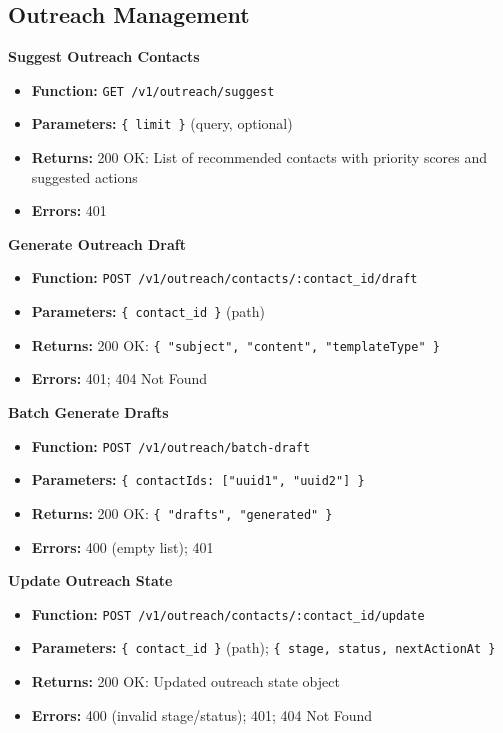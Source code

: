 \documentclass[a4paper]{article}
\begin{document}
\subsection{Outreach Management}

\textbf{Suggest Outreach Contacts}
\begin{itemize}
  \item \textbf{Function:} \texttt{GET /v1/outreach/suggest}
  \item \textbf{Parameters:} \texttt{\{ limit \}} (query, optional)
  \item \textbf{Returns:} 200 OK: List of recommended contacts with priority scores and suggested actions
  \item \textbf{Errors:} 401
\end{itemize}

\textbf{Generate Outreach Draft}
\begin{itemize}
  \item \textbf{Function:} \texttt{POST /v1/outreach/contacts/:contact\_id/draft}
  \item \textbf{Parameters:} \texttt{\{ contact\_id \}} (path)
  \item \textbf{Returns:} 200 OK: \texttt{\{ "subject", "content", "templateType" \}}
  \item \textbf{Errors:} 401; 404 Not Found
\end{itemize}

\textbf{Batch Generate Drafts}
\begin{itemize}
  \item \textbf{Function:} \texttt{POST /v1/outreach/batch-draft}
  \item \textbf{Parameters:} \texttt{\{ contactIds: ["uuid1", "uuid2"] \}}
  \item \textbf{Returns:} 200 OK: \texttt{\{ "drafts", "generated" \}}
  \item \textbf{Errors:} 400 (empty list); 401
\end{itemize}

\textbf{Update Outreach State}
\begin{itemize}
  \item \textbf{Function:} \texttt{POST /v1/outreach/contacts/:contact\_id/update}
  \item \textbf{Parameters:} \texttt{\{ contact\_id \}} (path); \texttt{\{ stage, status, nextActionAt \}}
  \item \textbf{Returns:} 200 OK: Updated outreach state object
  \item \textbf{Errors:} 400 (invalid stage/status); 401; 404 Not Found
\end{itemize}
\end{document}
